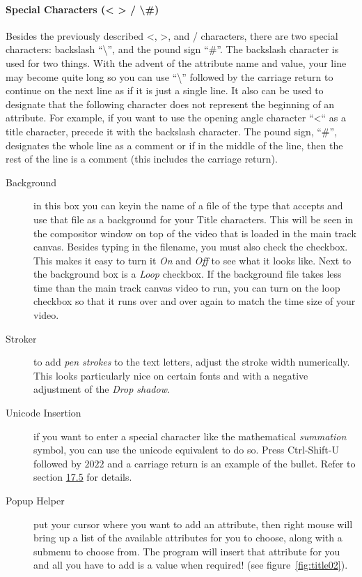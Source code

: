 \paragraph{Special Characters (< > / \textbackslash \#)} Besides the previously described <, >, and / characters, there are two special characters: backslash “\textbackslash”, and the pound sign “\#”. The backslash character is used for two things. With the advent of the attribute name and value, your line may become quite long so you can use “\textbackslash” followed by the carriage return to continue on the next line as if it is just a single line. It also can be used to designate that the following character does not represent the beginning of an attribute. For example, if you want to use the opening angle character “<“ as a title character, precede it with the backslash character. The pound sign, “\#”, designates the whole line as a comment or if in the middle of the line, then the rest of the line is a comment (this includes the carriage return).

\begin{description}
    \item[Background] in this box you can keyin the name of a file of the type that \CGG{} accepts and use that file as a background for your Title characters. This will be seen in the compositor window on top of the video that is loaded in the main track canvas. Besides typing in the filename, you must also check the checkbox. This makes it easy to turn it \textit{On} and \textit{Off} to see what it looks like. Next to the background box is a \textit{Loop} checkbox. If the background file takes less time than the main track canvas video to run, you can turn on the loop checkbox so that it runs over and over again to match the time size of your video.
    \item[Stroker] to add \textit{pen strokes} to the text letters, adjust the stroke width numerically. This looks particularly nice on certain fonts and with a negative adjustment of the \textit{Drop shadow}.
    \item[Unicode Insertion] if you want to enter a special character like the mathematical \textit{summation} symbol, you can use the unicode equivalent to do so. Press Ctrl-Shift-U followed by $2022$ and a carriage return is an example of the bullet. Refer to section \hyperref[sec:textbox_non_std_character_unicode]{17.5} for details.
    \item[Popup Helper] put your cursor where you want to add an attribute, then right mouse will bring up a list of the available attributes for you to choose, along with a submenu to choose from. The program will insert that attribute for you and all you have to add is a value when required! (see figure~\ref{fig:title02}).
\end{description}

